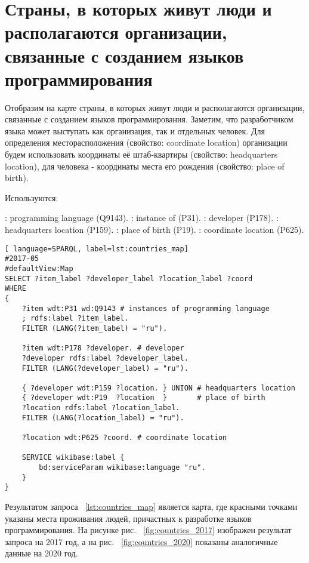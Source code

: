 \section{Страны, в которых живут люди и располагаются организации, связанные с созданием языков программирования}

Отобразим на карте страны, в которых живут люди и располагаются организации, связанные с созданием языков программирования. Заметим, что разработчиком языка может выступать как организация, так и отдельных человек. Для определения месторасположения (свойство: coordinate location) организации будем использовать координаты её штаб-квартиры (свойство: headquarters location), для человека - координаты места его рождения (свойство: place of birth).

Используются:
\begin{itemize}
: programming language (Q9143).
: instance of (P31).
: developer (P178).
: headquarters location (P159).
: place of birth (P19).
: coordinate location (P625).
\end{itemize}

\begin{lstlisting}[ language=SPARQL, label=lst:countries_map]
#2017-05
#defaultView:Map
SELECT ?item_label ?developer_label ?location_label ?coord
WHERE
{
    ?item wdt:P31 wd:Q9143 # instances of programming language
    ; rdfs:label ?item_label.     
    FILTER (LANG(?item_label) = "ru"). 
  
    ?item wdt:P178 ?developer. # developer
    ?developer rdfs:label ?developer_label. 
    FILTER (LANG(?developer_label) = "ru"). 
      		
    { ?developer wdt:P159 ?location. } UNION # headquarters location
    { ?developer wdt:P19  ?location  }       # place of birth
    ?location rdfs:label ?location_label. 
    FILTER (LANG(?location_label) = "ru").
    
    ?location wdt:P625 ?coord. # coordinate location

    SERVICE wikibase:label {
        bd:serviceParam wikibase:language "ru".
    }   	
}
\end{lstlisting}
Результатом запроса ~\ref{lst:countries_map} является карта, где красными точками указаны места проживания людей, причастных к разработке языков программирования. На рисунке рис. ~\ref{fig:countries_2017} изображен результат запроса на 2017 год, а на рис. ~\ref{fig:countries_2020} показаны аналогичные данные на 2020 год.

